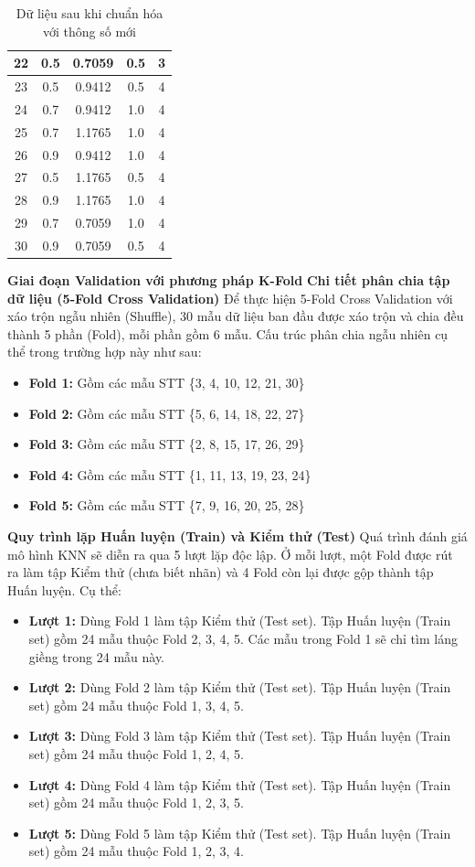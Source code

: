 \documentclass[12pt,a4paper]{article}
\begin{document}
\begin{table}[h]
\begin{tabular}{|c|c|c|c|c|}
22 & 0.5  & 0.7059  & 0.5  & 3 \\ \hline
23 & 0.5  & 0.9412  & 0.5  & 4 \\ \hline
24 & 0.7  & 0.9412  & 1.0  & 4 \\ \hline
25 & 0.7  & 1.1765  & 1.0  & 4 \\ \hline
26 & 0.9  & 0.9412  & 1.0  & 4 \\ \hline
27 & 0.5  & 1.1765  & 0.5  & 4 \\ \hline
28 & 0.9  & 1.1765  & 1.0  & 4 \\ \hline
29 & 0.7  & 0.7059  & 1.0  & 4 \\ \hline
30 & 0.9  & 0.7059  & 0.5  & 4 \\ \hline
\end{tabular}
\caption{Dữ liệu sau khi chuẩn hóa với thông số mới}
\end{table}
\newpage
\textbf{Giai đoạn Validation với phương pháp K-Fold} 
\textbf{Chi tiết phân chia tập dữ liệu (5-Fold Cross Validation)}
Để thực hiện 5-Fold Cross Validation với xáo trộn ngẫu nhiên (Shuffle), 30 mẫu dữ liệu ban đầu được xáo trộn và chia đều thành 5 phần (Fold), mỗi phần gồm 6 mẫu. Cấu trúc phân chia ngẫu nhiên cụ thể trong trường hợp này như sau:

\begin{itemize}
    \item \textbf{Fold 1:} Gồm các mẫu STT \{3, 4, 10, 12, 21, 30\}
    \item \textbf{Fold 2:} Gồm các mẫu STT \{5, 6, 14, 18, 22, 27\}
    \item \textbf{Fold 3:} Gồm các mẫu STT \{2, 8, 15, 17, 26, 29\}
    \item \textbf{Fold 4:} Gồm các mẫu STT \{1, 11, 13, 19, 23, 24\}
    \item \textbf{Fold 5:} Gồm các mẫu STT \{7, 9, 16, 20, 25, 28\}
\end{itemize}

\textbf{Quy trình lặp Huấn luyện (Train) và Kiểm thử (Test)}
Quá trình đánh giá mô hình KNN sẽ diễn ra qua 5 lượt lặp độc lập. Ở mỗi lượt, một Fold được rút ra làm tập Kiểm thử (chưa biết nhãn) và 4 Fold còn lại được gộp thành tập Huấn luyện. Cụ thể:

\begin{itemize}
    \item \textbf{Lượt 1:} Dùng Fold 1 làm tập Kiểm thử (Test set). Tập Huấn luyện (Train set) gồm 24 mẫu thuộc Fold 2, 3, 4, 5. Các mẫu trong Fold 1 sẽ chỉ tìm láng giềng trong 24 mẫu này.
    \item \textbf{Lượt 2:} Dùng Fold 2 làm tập Kiểm thử (Test set). Tập Huấn luyện (Train set) gồm 24 mẫu thuộc Fold 1, 3, 4, 5.
    \item \textbf{Lượt 3:} Dùng Fold 3 làm tập Kiểm thử (Test set). Tập Huấn luyện (Train set) gồm 24 mẫu thuộc Fold 1, 2, 4, 5.
    \item \textbf{Lượt 4:} Dùng Fold 4 làm tập Kiểm thử (Test set). Tập Huấn luyện (Train set) gồm 24 mẫu thuộc Fold 1, 2, 3, 5.
    \item \textbf{Lượt 5:} Dùng Fold 5 làm tập Kiểm thử (Test set). Tập Huấn luyện (Train set) gồm 24 mẫu thuộc Fold 1, 2, 3, 4.
\end{itemize}
\end{document}
